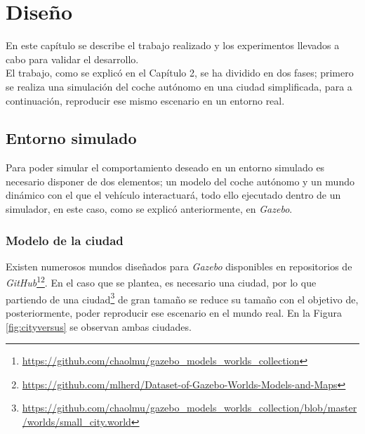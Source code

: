\chapter{Diseño}
\label{cap:capitulo4}

En este capítulo se describe el trabajo realizado y los experimentos llevados a cabo para validar el desarrollo.\\

El trabajo, como se explicó en el Capítulo 2, se ha dividido en dos fases; primero se realiza una simulación del coche autónomo en una ciudad simplificada, para a continuación,
reproducir ese mismo escenario en un entorno real.\\

\section{Entorno simulado}
\label{section:simulation}
Para poder simular el comportamiento deseado en un entorno simulado es necesario disponer de dos elementos; un modelo del coche autónomo y un mundo dinámico con el que el vehículo
interactuará, todo ello ejecutado dentro de un simulador, en este caso, como se explicó anteriormente, en \textit{Gazebo}.\\

\subsection{Modelo de la ciudad}
\label{subsection:citymodel}
Existen numerosos mundos diseñados para \textit{Gazebo} disponibles en repositorios de
\textit{GitHub}\footnote{\url{https://github.com/chaolmu/gazebo_models_worlds_collection}}\footnote{\url{https://github.com/mlherd/Dataset-of-Gazebo-Worlds-Models-and-Maps}}. En
el caso que se plantea, es necesario una ciudad, por lo que partiendo de una
ciudad\footnote{\url{https://github.com/chaolmu/gazebo_models_worlds_collection/blob/master/worlds/small_city.world}} de gran tamaño se reduce su tamaño con el objetivo de,
posteriormente, poder reproducir ese escenario en el mundo real. En la Figura \ref{fig:cityversus} se observan ambas ciudades.\\

